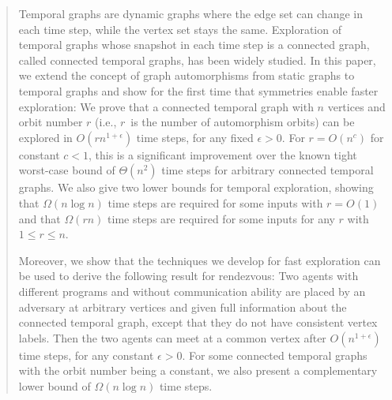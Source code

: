 \documentclass[10pt,a4paper]{article}
\begin{document}
\maketitle

\begin{abstract} 
Temporal graphs are dynamic graphs where the edge set can change in each time
step, while the vertex set stays the same. Exploration of temporal graphs whose
snapshot in each time step is a connected graph, called connected temporal
graphs, has been widely studied. In this paper, we extend the concept of graph
automorphisms from static graphs to temporal graphs and show for the first
time that symmetries enable faster exploration: We prove that a connected temporal
graph with $n$ vertices and orbit number $r$ (i.e., $r$~is the number of
automorphism orbits) can be explored in $O(r n^{1+\epsilon})$ time steps, for any
fixed $\epsilon>0$. For $r=O(n^c)$ for constant $c<1$, this is a significant
improvement over the known tight worst-case bound of $\Theta(n^2)$ time steps
for arbitrary connected temporal graphs. We also give two lower bounds for
temporal exploration, showing that $\Omega(n \log n)$ time steps are required
for some inputs with $r=O(1)$ and that $\Omega(rn)$ time steps are required for
some inputs for any $r$ with $1\le r\le n$.

Moreover, we show that the techniques we develop for fast exploration can be
used to derive the following result for rendezvous: Two agents with different
programs and without communication ability are placed by an adversary at
arbitrary vertices and given full information about the connected temporal
graph, except that they do not have consistent vertex labels. Then the two
agents can meet at a common vertex after $O(n^{1+\epsilon})$ time steps, for any
constant $\epsilon>0$. For some connected temporal graphs with the orbit number
being a constant, we also present a complementary lower bound of $\Omega(n\log
n)$ time steps. 
\end{abstract}
\end{document}
